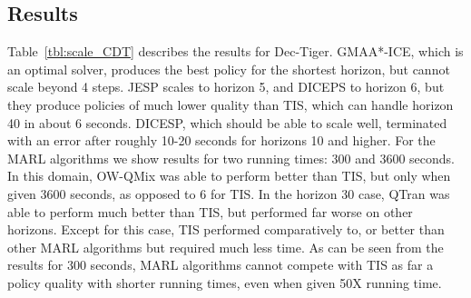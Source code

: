 \documentclass[runningheads]{llncs}
\newcommand{\eliran}[1]{\textbf{[\color{red}ELIRAN:#1]}}
\newcommand{\ronen}[1]{\textbf{[\color{blue}RONEN:#1]}}
\newcommand{\cbp}[0]{Collaborative Box-Pushing}
\newcommand{\cdt}[0]{Collaborative Dec-Tiger}
\newcommand{\drs}[0]{Decentralized Rock-Sampling}
\begin{document}


\subsection{Results}

Table~\ref{tbl:scale_CDT} describes the results for Dec-Tiger.
GMAA*-ICE, which is an optimal solver, produces the best policy for the shortest horizon, but cannot scale beyond 4 steps. JESP scales to horizon 5, and DICEPS to horizon 6, but they produce policies of much lower quality than TIS, which can handle horizon 40 in about 6 seconds. DICESP, which should be able to scale well, terminated with an error after roughly 10-20 seconds for horizons 10 and higher. 
For the MARL algorithms we show results for two running times: 300 and 3600 seconds.
In this domain, OW-QMix was able to perform better than TIS, but only
when given 3600 seconds, as opposed to 6 for TIS. In the horizon 30 case, QTran was able to perform much better than TIS, but performed far worse on other horizons. Except for this case, TIS performed comparatively to,
or better than other MARL algorithms but required much less time. As can be seen from the results for 300 seconds, MARL algorithms cannot compete with
TIS as far a policy quality with shorter running times, even when
given 50X running time. 

\end{document}
